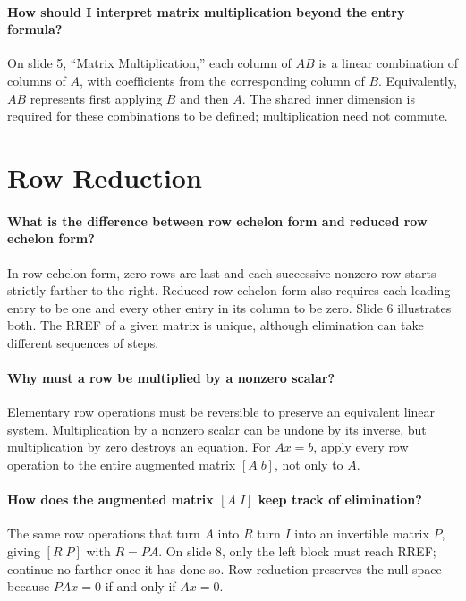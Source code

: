 \documentclass[10pt,english]{article}
\begin{document}
\paragraph{How should I interpret matrix multiplication beyond the entry formula?}
On slide 5, ``Matrix Multiplication,'' each column of $AB$ is a linear combination of columns of $A$, with coefficients from the corresponding column of $B$.
Equivalently, $AB$ represents first applying $B$ and then $A$.
The shared inner dimension is required for these combinations to be defined; multiplication need not commute.

\section{Row Reduction}

\paragraph{What is the difference between row echelon form and reduced row echelon form?}
In row echelon form, zero rows are last and each successive nonzero row starts strictly farther to the right.
Reduced row echelon form also requires each leading entry to be one and every other entry in its column to be zero.
Slide 6 illustrates both. The RREF of a given matrix is unique, although elimination can take different sequences of steps.

\paragraph{Why must a row be multiplied by a nonzero scalar?}
Elementary row operations must be reversible to preserve an equivalent linear system.
Multiplication by a nonzero scalar can be undone by its inverse, but multiplication by zero destroys an equation.
For $Ax=b$, apply every row operation to the entire augmented matrix $[A\;b]$, not only to $A$.

\paragraph{How does the augmented matrix $[A\;I]$ keep track of elimination?}
The same row operations that turn $A$ into $R$ turn $I$ into an invertible matrix $P$, giving $[R\;P]$ with $R=PA$.
On slide 8, only the left block must reach RREF; continue no farther once it has done so.
Row reduction preserves the null space because $PAx=0$ if and only if $Ax=0$.
\end{document}
